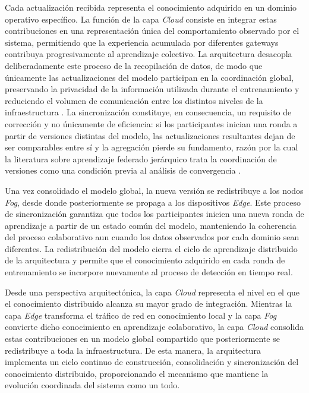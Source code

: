 \documentclass[journal,article,submit,moreauthors]{Definitions/mdpi}
\begin{document}
Cada actualización recibida representa el conocimiento adquirido en un dominio operativo específico. La función de la capa \textit{Cloud} consiste en integrar estas contribuciones en una representación única del comportamiento observado por el sistema, permitiendo que la experiencia acumulada por diferentes gateways contribuya progresivamente al aprendizaje colectivo. La arquitectura desacopla deliberadamente este proceso de la recopilación de datos, de modo que únicamente las actualizaciones del modelo participan en la coordinación global, preservando la privacidad de la información utilizada durante el entrenamiento y reduciendo el volumen de comunicación entre los distintos niveles de la infraestructura \cite{Hajj2023,Ficco2024}. La sincronización constituye, en consecuencia, un requisito de corrección y no únicamente de eficiencia: si los participantes inician una ronda a partir de versiones distintas del modelo, las actualizaciones resultantes dejan de ser comparables entre sí y la agregación pierde su fundamento, razón por la cual la literatura sobre aprendizaje federado jerárquico trata la coordinación de versiones como una condición previa al análisis de convergencia \cite{Ma2024,Cooray2025}.

Una vez consolidado el modelo global, la nueva versión se redistribuye a los nodos \textit{Fog}, desde donde posteriormente se propaga a los dispositivos \textit{Edge}. Este proceso de sincronización garantiza que todos los participantes inicien una nueva ronda de aprendizaje a partir de un estado común del modelo, manteniendo la coherencia del proceso colaborativo aun cuando los datos observados por cada dominio sean diferentes. La redistribución del modelo cierra el ciclo de aprendizaje distribuido de la arquitectura y permite que el conocimiento adquirido en cada ronda de entrenamiento se incorpore nuevamente al proceso de detección en tiempo real.

Desde una perspectiva arquitectónica, la capa \textit{Cloud} representa el nivel en el que el conocimiento distribuido alcanza su mayor grado de integración. Mientras la capa \textit{Edge} transforma el tráfico de red en conocimiento local y la capa \textit{Fog} convierte dicho conocimiento en aprendizaje colaborativo, la capa \textit{Cloud} consolida estas contribuciones en un modelo global compartido que posteriormente se redistribuye a toda la infraestructura. De esta manera, la arquitectura implementa un ciclo continuo de construcción, consolidación y sincronización del conocimiento distribuido, proporcionando el mecanismo que mantiene la evolución coordinada del sistema como un todo.
\end{document}

